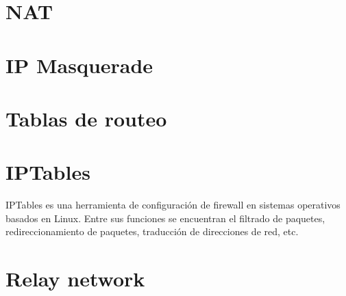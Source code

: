 \section{NAT} %
\section{IP Masquerade} %

\section{Tablas de routeo}  


\section{IPTables} %
IPTables es una herramienta de configuración de firewall en sistemas operativos basados en Linux. Entre sus funciones se encuentran el filtrado de paquetes, redireccionamiento de paquetes, traducción de direcciones de red, etc.



\section{Relay network}%
